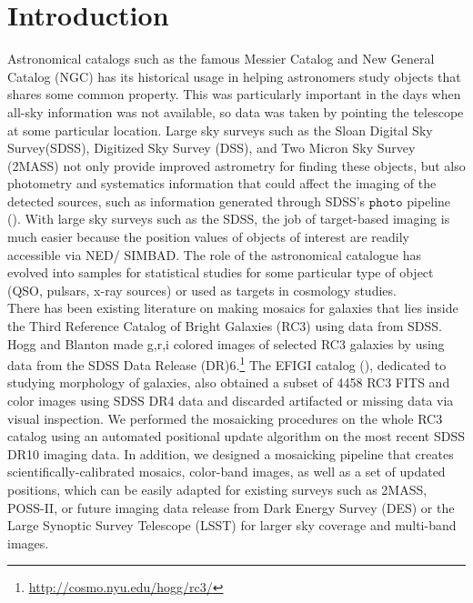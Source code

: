 \documentclass[5p]{elsarticle}
\begin{document}
\section{Introduction}
Astronomical catalogs such as the famous Messier Catalog and New General Catalog (NGC) has its historical usage in helping  astronomers  study objects that shares some common property. This was particularly important in the days when all-sky information was not available, so data was taken by pointing the telescope at some particular location.  
Large sky surveys such as the Sloan Digital Sky Survey(SDSS), Digitized Sky Survey (DSS), and Two Micron Sky Survey (2MASS) not only provide improved astrometry for finding these objects, but also photometry and systematics information that could affect the imaging of the detected sources, such as information generated through SDSS's $\texttt{photo}$ pipeline (\citet{photopaper}).
With large sky surveys such as the SDSS, the job of target-based imaging is much  easier because the position values of objects of interest are readily accessible via NED/ SIMBAD. The role of the astronomical catalogue has evolved into samples for statistical studies for some particular type of object (QSO, pulsars, x-ray sources) or used as targets in cosmology studies.
\\
\indent
There has been existing literature on making mosaics for galaxies that lies inside the Third Reference Catalog of Bright Galaxies  (RC3) using data from SDSS. Hogg and Blanton made g,r,i colored images of selected RC3 galaxies by using data from the SDSS Data Release (DR)6.\footnote{\url{http://cosmo.nyu.edu/hogg/rc3/}} The EFIGI catalog (\citet{efigi}), dedicated to studying morphology of galaxies, also  obtained a subset of 4458 RC3 FITS and color images using SDSS DR4 data and discarded artifacted or missing data via visual inspection. We performed the mosaicking procedures on the whole RC3 catalog using an automated positional update algorithm on the most recent SDSS DR10 imaging data. In addition, we designed a mosaicking pipeline that creates scientifically-calibrated mosaics, color-band images, as well as a set of updated positions, which can be easily adapted for existing surveys such as 2MASS, POSS-II, or future imaging data release from  Dark Energy Survey (DES) or the Large Synoptic Survey Telescope (LSST) for larger sky coverage and multi-band images.
\end{document}
